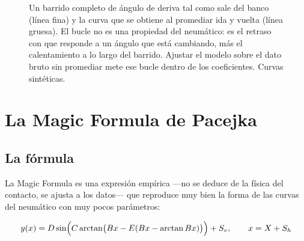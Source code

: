 \begin{figure}[htbp]
\centering
{}
\caption[Dato bruto frente a curva promediada]{Un barrido completo de ángulo de
deriva tal como sale del banco (línea fina) y la curva que se obtiene al
promediar ida y vuelta (línea gruesa). El bucle no es una propiedad del
neumático: es el retraso con que responde a un ángulo que está cambiando, más el
calentamiento a lo largo del barrido. Ajustar el modelo sobre el dato bruto sin
promediar mete ese bucle dentro de los coeficientes. Curvas sintéticas.}
\label{fig:modelado:brutos}
\end{figure}

\section{La Magic Formula de Pacejka}
\label{sec:modelado_neumatico:03}

\subsection{La fórmula}

La Magic Formula \cite{bakker_tiremodel_1987,pacejka_tirevehicle_2012} es una
expresión empírica ---no se deduce de la física del contacto, se ajusta a los
datos--- que reproduce muy bien la forma de las curvas del neumático con muy
pocos parámetros:

\begin{equation}
  y(x) = D \sin\Bigl(C \arctan\bigl(B x -
         E(B x - \arctan B x)\bigr)\Bigr) + S_v,
  \qquad x = X + S_h
  \label{eq:magic_formula}
\end{equation}

